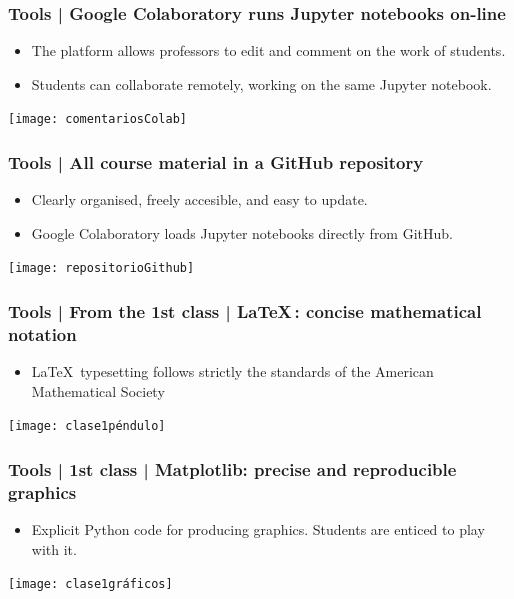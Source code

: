 \documentclass[aspectratio=169]{beamer}
\begin{document}
\begin{frame}
	\frametitle{Tools | Google Colaboratory runs Jupyter notebooks on-line}
	\begin{block}{}
		\begin{itemize}
			\item The platform allows professors to edit and comment on the work of students.
			\item Students can collaborate remotely, working on the same Jupyter notebook.
		\end{itemize}
	\texttt{[image: comentariosColab]}
	\end{block}
\end{frame}


\begin{frame}
	\frametitle{Tools | All course material in a GitHub repository}
	\begin{block}{}
		\begin{itemize}
			\item Clearly organised, freely accesible, and easy to update.
			\item Google Colaboratory loads Jupyter notebooks directly from GitHub.
		\end{itemize}
	\texttt{[image: repositorioGithub]}
	\end{block}
\end{frame}


\begin{frame}
	\frametitle{Tools | From the 1st class | \LaTeX \,: concise mathematical notation}
	\begin{block}{}
		\begin{itemize}
			\item \LaTeX \, typesetting follows strictly the standards of the American Mathematical Society
		\end{itemize}
	\texttt{[image: clase1péndulo]}
	\end{block}
\end{frame}


\begin{frame}
	\frametitle{Tools | 1st class | Matplotlib: precise and reproducible graphics}
	\begin{block}{}
		\begin{itemize}
			\item Explicit Python code for producing graphics. Students are enticed to play with it.
		\end{itemize}
	\texttt{[image: clase1gráficos]}
	\end{block}
\end{frame}
\end{document}
